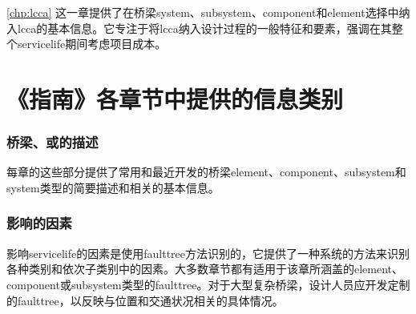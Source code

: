 \cref{chp:lcca}  这一章提供了在桥梁\gls{system}、\gls{subsystem}、\gls{component}和\gls{element}选择中纳入\acrfull{lcca}的基本信息。它专注于将\acrlong{lcca}纳入设计过程的一般特征和要素，强调在其整个\gls{servicelife}期间考虑项目成本。


\section{《指南》各章节中提供的信息类别}
\subsubsection*{桥梁、或的描述}
每章的这些部分提供了常用和最近开发的桥梁\gls{element}、\gls{component}、\gls{subsystem}和\gls{system}类型的简要描述和相关的基本信息。

\subsubsection*{影响的因素}
影响\gls*{servicelife}的因素是使用\gls*{faulttree}方法识别的，它提供了一种系统的方法来识别各种类别和依次子类别中的因素。大多数章节都有适用于该章所涵盖的\gls*{element}、\gls*{component}或\gls*{subsystem}类型的\gls*{faulttree}。对于大型复杂桥梁，设计人员应开发定制的\gls*{faulttree}，以反映与位置和交通状况相关的具体情况。


